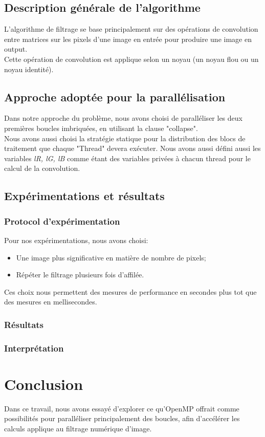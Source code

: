 \documentclass{report}
\begin{document}
\section{Description générale de l'algorithme}
L'algorithme de filtrage se base principalement sur des opérations de convolution entre matrices
 sur les pixels d'une image en entrée pour produire une image en output.\\
Cette opération de convolution est applique selon un noyau (un noyau flou ou un noyau identité).
\section{Approche adoptée pour la parallélisation }
Dans notre approche du problème, nous avons choisi de paralléliser les deux premières
boucles imbriquées, en utilisant la clause "collapse".\\
Nous avons aussi choisi la stratégie statique pour la distribution des blocs de traitement
que chaque "Thread" devera exécuter. Nous avons aussi défini aussi les variables \textit{lR, lG, lB}
comme étant des variables privées à chacun thread pour le calcul de la convolution.
\section{Expérimentations et résultats}
\subsection{Protocol d'expérimentation}
Pour nos expérimentations, nous avons choisi:
\begin{itemize}
	\item Une image plus significative en matière de nombre de pixels;
	\item Répéter le filtrage plusieurs fois d'affilée.
\end{itemize}
Ces choix nous permettent des mesures de performance en secondes plus
tot que des mesures en mellisecondes.
\subsection{Résultats}
\subsection{Interprétation}

\chapter{Conclusion}
Dans ce travail, nous avons essayé d'explorer ce qu'OpenMP offrait comme possibilités pour
paralléliser principalement des boucles, afin d'accélérer les calculs applique au filtrage
numérique d'image.
\end{document}
